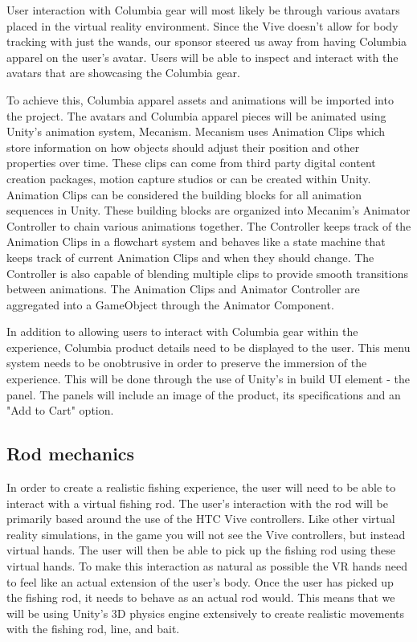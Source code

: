 \documentclass[10pt,journal,compsoc,onecolumn, draftclsnofoot]{IEEEtran}
\begin{document}
User interaction with Columbia gear will most likely be through various avatars placed in the virtual reality environment. Since the Vive doesn't allow for body tracking with just the wands, our sponsor steered us away from having Columbia apparel on the user's avatar. Users will be able to inspect and interact with the avatars that are showcasing the Columbia gear.

To achieve this, Columbia apparel assets and animations will be imported into the project. The avatars and Columbia apparel pieces will be animated using Unity's animation system, Mecanism. Mecanism uses Animation Clips which store information on how objects should adjust their position and other properties over time. These clips can come from third party digital content creation packages, motion capture studios or can be created within Unity. Animation Clips can be considered the building blocks for all animation sequences in Unity. These building blocks are organized into Mecanim's Animator Controller to chain various animations together. The Controller keeps track of the Animation Clips in a flowchart system and behaves like a state machine that keeps track of current Animation Clips and when they should change. The Controller is also capable of blending multiple clips to provide smooth transitions between animations. The Animation Clips and Animator Controller are aggregated into a GameObject through the Animator Component.\cite{unity_animation}

In addition to allowing users to interact with Columbia gear within the experience, Columbia product details need to be displayed to the user. This menu system needs to be onobtrusive in order to preserve the immersion of the experience. This will be done through the use of Unity's in build UI element - the panel. The panels will include an image of the product, its specifications and an "Add to Cart" option.

\subsection{Rod mechanics}
In order to create a realistic fishing experience, the user will need to be able to interact with a virtual fishing rod.
The user's interaction with the rod will be primarily based around the use of the HTC Vive controllers.
Like other virtual reality simulations, in the game you will not see the Vive controllers, but instead virtual hands.
The user will then be able to pick up the fishing rod using these virtual hands.
To make this interaction as natural as possible the VR hands need to feel like an actual extension of the user's body.
Once the user has picked up the fishing rod, it needs to behave as an actual rod would.
This means that we will be using Unity's 3D physics engine extensively to create realistic movements with the fishing rod, line, and bait.
\end{document}
